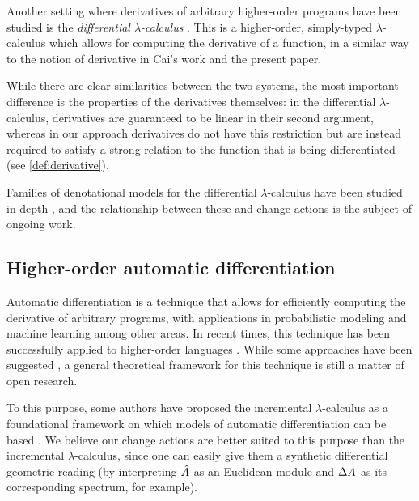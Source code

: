 Another setting where derivatives of arbitrary higher-order programs have been studied
is the \emph{differential $\lambda$-calculus} \autocites{ehrhard2003differential}{ehrhard2017introduction}.
This is a higher-order, simply-typed $\lambda$-calculus which allows for computing the derivative of a function, in a similar
way to the notion of derivative in Cai's work and the present paper.

While there are clear similarities between the two systems, 
the most important difference is the properties of the derivatives themselves:
in the differential $\lambda$-calculus, derivatives are guaranteed to be linear
in their second argument, whereas in our approach derivatives do not have this restriction 
but are instead required to satisfy a strong relation to the function
that is being differentiated (see \cref{def:derivative}).

Families of denotational models for the differential $\lambda$-calculus have been
studied in depth
\autocites{bucciarelli2010categorical}{blute2010convenient}{cockett2016categorical}{kerjean2016mackey},
and the relationship between these and change actions is the subject of ongoing work.

\subsection{Higher-order automatic differentiation}

Automatic differentiation \autocite{griewank2008evaluating} is a technique that allows
for efficiently computing the derivative of arbitrary programs, with
applications in probabilistic modeling \autocite{kucukelbir2017automatic}
and machine learning \autocite{baydin2014automatic} among other areas. In recent times, this technique has been successfully
applied to higher-order languages \autocites{siskind2008nesting}{baydin2016diffsharp}.
While some approaches have been suggested \autocites{manzyuk2012simply}{kelly2016evolving}, a general
theoretical framework for this technique is still a matter of open research. 

To this purpose, some authors have proposed the incremental $\lambda$-calculus
as a foundational framework on which models of automatic differentiation can
be based \autocite{kelly2016evolving}. We believe our change actions are better suited
to this purpose than the incremental $\lambda$-calculus, since one can easily give them a
synthetic differential geometric reading (by interpreting $\hat{A}$ as an Euclidean module and $\Delta A$
as its corresponding spectrum, for example).


